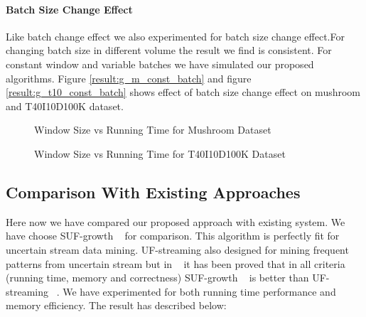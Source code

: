     \paragraph{Batch Size Change Effect}Like batch change effect we also experimented for batch size change effect.For changing batch size in different volume the result we find is consistent. For constant window and variable batches we have simulated our proposed algorithms. Figure \ref{result:g_m_const_batch} and figure \ref{result:g_t10_const_batch} shows effect of batch size change effect on mushroom and T40I10D100K dataset.
        \begin{figure}[h]
        \centering
            
        \caption{Window Size vs Running Time for Mushroom Dataset }
        \label{result:g_m_const_win}
        \end{figure}
        \begin{figure}[h]
        \centering
            
        \caption{Window Size vs Running Time for T40I10D100K Dataset }
        \label{result:g_t10_const_win}
        \end{figure}
\clearpage
\subsection{Comparison With Existing Approaches}
Here now we have compared our proposed approach with existing system. We have choose SUF-growth ~\cite{suf_growth}  for comparison. This algorithm is perfectly fit for uncertain stream data mining. UF-streaming also designed for mining frequent patterns from uncertain stream but in ~\cite{suf_growth} it has been proved that in all criteria (running time, memory and correctness) SUF-growth ~\cite{suf_growth} is better than UF-streaming ~\cite{suf_growth}. We have experimented for both running time performance and memory efficiency. The result has described below:
